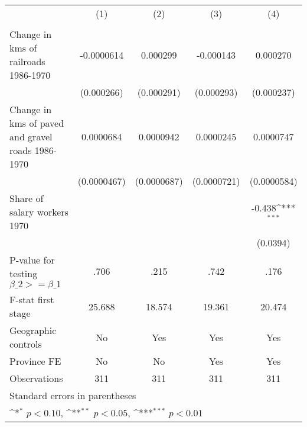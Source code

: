 {
\def\sym#1{\ifmmode^{#1}\else\(^{#1}\)\fi}
\begin{tabular}{l*{4}{c}}
\hline\hline
                &\multicolumn{1}{c}{(1)}&\multicolumn{1}{c}{(2)}&\multicolumn{1}{c}{(3)}&\multicolumn{1}{c}{(4)}\\
                &\multicolumn{1}{c}{}&\multicolumn{1}{c}{}&\multicolumn{1}{c}{}&\multicolumn{1}{c}{}\\
\hline
Change in kms of railroads 1986-1970&-0.0000614         & 0.000299         &-0.000143         & 0.000270         \\
                &(0.000266)         &(0.000291)         &(0.000293)         &(0.000237)         \\
[1em]
Change in kms of paved and gravel roads 1986-1970&0.0000684         &0.0000942         &0.0000245         &0.0000747         \\
                &(0.0000467)         &(0.0000687)         &(0.0000721)         &(0.0000584)         \\
[1em]
Share of salary workers 1970&                  &                  &                  &   -0.438\sym{***}\\
                &                  &                  &                  & (0.0394)         \\
\hline
P-value for testing $\beta\_{2} >= \beta\_{1}$&     .706         &     .215         &     .742         &     .176         \\
F-stat first stage&   25.688         &   18.574         &   19.361         &   20.474         \\
Geographic controls&       No         &      Yes         &      Yes         &      Yes         \\
Province FE     &       No         &       No         &      Yes         &      Yes         \\
Observations    &      311         &      311         &      311         &      311         \\
\hline\hline
\multicolumn{5}{l}{\footnotesize Standard errors in parentheses}\\
\multicolumn{5}{l}{\footnotesize \sym{*} \(p<0.10\), \sym{**} \(p<0.05\), \sym{***} \(p<0.01\)}\\
\end{tabular}
}
